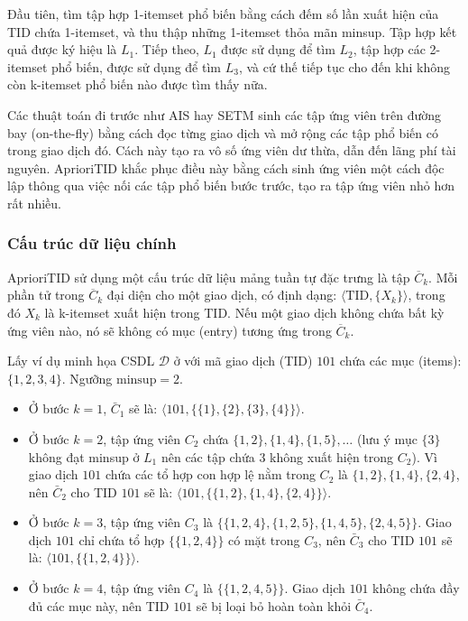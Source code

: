 \documentclass[12pt]{article}
\begin{document}
Đầu tiên, tìm tập hợp 1-itemset phổ biến bằng cách đếm số lần xuất hiện của TID chứa 1-itemset, và thu thập những 1-itemset thỏa mãn minsup. Tập hợp kết quả được ký hiệu là $L_1$. Tiếp theo, $L_1$ được sử dụng để tìm $L_2$, tập hợp các 2-itemset phổ biến, được sử dụng để tìm $L_3$, và cứ thế tiếp tục cho đến khi không còn k-itemset phổ biến nào được tìm thấy nữa.

Các thuật toán đi trước như AIS hay SETM sinh các tập ứng viên trên đường bay (on-the-fly) bằng cách đọc từng giao dịch và mở rộng các tập phổ biến có trong giao dịch đó. Cách này tạo ra vô số ứng viên dư thừa, dẫn đến lãng phí tài nguyên. AprioriTID khắc phục điều này bằng cách sinh ứng viên một cách độc lập thông qua việc nối các tập phổ biến bước trước, tạo ra tập ứng viên nhỏ hơn rất nhiều.

\subsubsection{Cấu trúc dữ liệu chính}
AprioriTID sử dụng một cấu trúc dữ liệu mảng tuần tự đặc trưng là tập $\overline{C}_k$.  Mỗi phần tử trong $\overline{C}_k$ đại diện cho một giao dịch, có định dạng: \colorbox{black!10}{$\langle \text{TID},\{X_k\}\rangle$}, trong đó $X_k$ là k-itemset xuất hiện trong TID. Nếu một giao dịch không chứa bất kỳ ứng viên nào, nó sẽ không có mục (entry) tương ứng trong $\overline{C}_k$.

Lấy ví dụ minh họa CSDL $\mathcal{D}$ ở  với mã giao dịch (TID) $101$ chứa các mục (items): $\{1, 2, 3, 4\}$. Ngưỡng $\text{minsup} = 2$.

\begin{itemize}
    \item Ở bước $k=1$, $\bar{C}_1$ sẽ là: $\langle 101, \{\{1\}, \{2\}, \{3\}, \{4\}\} \rangle$.
    \item Ở bước $k=2$, tập ứng viên $C_2$ chứa $\{1, 2\}, \{1, 4\}, \{1, 5\}, \dots$ (lưu ý mục $\{3\}$ không đạt minsup ở $L_1$ nên các tập chứa $3$ không xuất hiện trong $C_2$). Vì giao dịch $101$ chứa các tổ hợp con hợp lệ nằm trong $C_2$ là $\{1, 2\}, \{1, 4\}, \{2, 4\}$, nên $\bar{C}_2$ cho TID $101$ sẽ là: $\langle 101, \{\{1, 2\}, \{1, 4\}, \{2, 4\}\} \rangle$.
    \item Ở bước $k=3$, tập ứng viên $C_3$ là $\{\{1, 2, 4\}, \{1, 2, 5\}, \{1, 4, 5\}, \{2, 4, 5\}\}$. Giao dịch $101$ chỉ chứa tổ hợp $\{\{1, 2, 4\}\}$ có mặt trong $C_3$, nên $\bar{C}_3$ cho TID $101$ sẽ là: $\langle 101, \{\{1, 2, 4\}\} \rangle$.
    \item Ở bước $k=4$, tập ứng viên $C_4$ là $\{\{1, 2, 4, 5\}\}$. Giao dịch $101$ không chứa đầy đủ các mục này, nên TID $101$ sẽ bị loại bỏ hoàn toàn khỏi $\bar{C}_4$.
\end{itemize}
\end{document}
